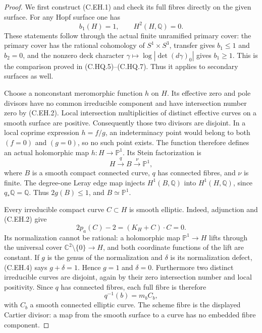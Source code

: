 \begin{proof}
We first construct (C.EH.1) and check its full fibres directly
on the given surface. For any Hopf surface one has
\[
                    b_1(H)=1,\qquad H^2(H,\mathbb Q)=0.
\tag{C.EH.2}
\]
These statements follow through the actual finite unramified
primary cover: the primary cover has the rational cohomology
of $S^1\times S^3$, transfer gives $b_1\leq1$ and $b_2=0$,
and the nonzero deck character
$\gamma\mapsto\log|\det(d\gamma)_0|$ gives $b_1\geq1$.
This is the comparison proved in (C.HQ.5)--(C.HQ.7).
Thus it applies to secondary surfaces as well.

Choose a nonconstant meromorphic function $h$ on $H$.
Its effective zero and pole divisors have no common
irreducible component and have intersection number zero
by (C.EH.2). Local intersection multiplicities of distinct
effective curves on a smooth surface are positive.
Consequently those two divisors are disjoint. In a local
coprime expression $h=f/g$, an indeterminacy point would
belong to both $(f=0)$ and $(g=0)$, so no such point exists.
The function therefore defines an actual holomorphic map
$h:H\to\mathbb P^1$. Its Stein factorization is
\[
               H\xrightarrow{q}B\xrightarrow{\nu}\mathbb P^1,
\tag{C.EH.3}
\]
where $B$ is a smooth compact connected curve, $q$ has
connected fibres, and $\nu$ is finite. The degree-one
Leray edge map injects $H^1(B,\mathbb Q)$ into
$H^1(H,\mathbb Q)$, since $q_*\mathbb Q=\mathbb Q$.
Thus $2g(B)\leq1$, and $B\simeq\mathbb P^1$.

Every irreducible compact curve $C\subset H$ is smooth
elliptic. Indeed, adjunction and (C.EH.2) give
\[
                 2p_a(C)-2=(K_H+C)\cdot C=0.
\tag{C.EH.4}
\]
Its normalization cannot be rational: a holomorphic map
$\mathbb P^1\to H$ lifts through the universal cover
$\mathbb C^2\setminus\{0\}\to H$, and both coordinate
functions of the lift are constant. If $g$ is the genus
of the normalization and $\delta$ is its normalization
defect, (C.EH.4) says $g+\delta=1$. Hence $g=1$ and
$\delta=0$. Furthermore two distinct irreducible curves
are disjoint, again by their zero intersection number
and local positivity. Since $q$ has connected fibres,
each full fibre is therefore
\[
                              q^{-1}(b)=m_b C_b,
\tag{C.EH.5}
\]
with $C_b$ a smooth connected elliptic curve. The scheme
fibre is the displayed Cartier divisor: a map from the
smooth surface to a curve has no embedded fibre component.


\end{proof}
